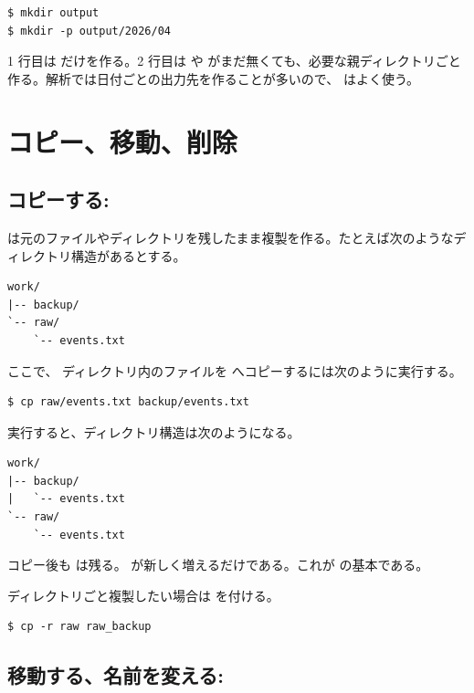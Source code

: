 \begin{lstlisting}[numbers=none, xleftmargin=2\zw]
$ mkdir output
$ mkdir -p output/2026/04
\end{lstlisting}

1 行目は  だけを作る。2 行目は  や  がまだ無くても、必要な親ディレクトリごと作る。解析では日付ごとの出力先を作ることが多いので、 はよく使う。

\section{コピー、移動、削除}

\subsection{コピーする: }

 は元のファイルやディレクトリを残したまま複製を作る。たとえば次のようなディレクトリ構造があるとする。

\begin{lstlisting}[numbers=none, xleftmargin=2\zw]
work/
|-- backup/
`-- raw/
    `-- events.txt
\end{lstlisting}

ここで、 ディレクトリ内のファイルを  へコピーするには次のように実行する。

\begin{lstlisting}[numbers=none, xleftmargin=2\zw]
$ cp raw/events.txt backup/events.txt
\end{lstlisting}

実行すると、ディレクトリ構造は次のようになる。

\begin{lstlisting}[numbers=none, xleftmargin=2\zw]
work/
|-- backup/
|   `-- events.txt
`-- raw/
    `-- events.txt
\end{lstlisting}

コピー後も  は残る。 が新しく増えるだけである。これが  の基本である。

ディレクトリごと複製したい場合は  を付ける。

\begin{lstlisting}[numbers=none, xleftmargin=2\zw]
$ cp -r raw raw_backup
\end{lstlisting}

\subsection{移動する、名前を変える: }

